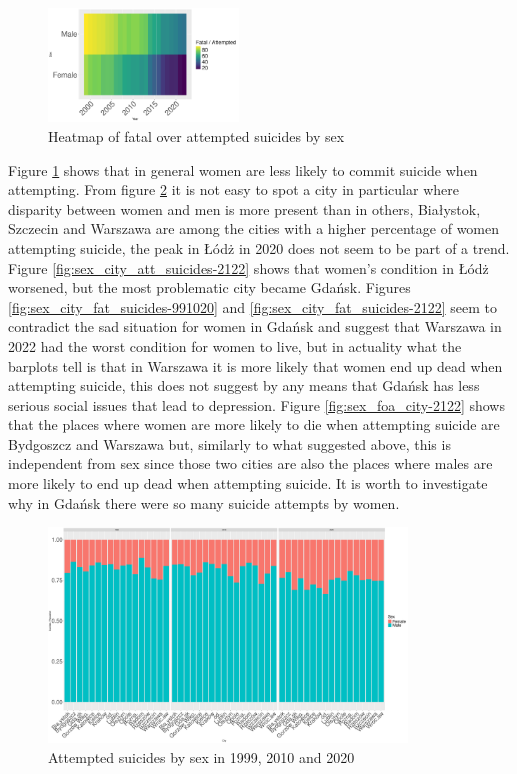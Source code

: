 \documentclass{article}
\begin{document}
\begin{figure}[H]
    \centering
    \includegraphics[width=0.45\textwidth]{imgs/sex_foa_heat.pdf}
    \caption{Heatmap of fatal over attempted suicides by sex}
    \label{fig:sex_foa_heat}
\end{figure}
%
%
Figure \ref{fig:sex_foa_heat} shows that in general women are less likely to commit
suicide when attempting.
%
From figure \ref{fig:sex_city_att_suicides-991020} it is not easy to spot a city in particular
where disparity between women and men is more present than in others,
Białystok, Szczecin and Warszawa are among the cities with a higher percentage
of women attempting suicide, the peak in Łódż in 2020 does not seem to be part of a trend.
Figure \ref{fig:sex_city_att_suicides-2122} shows that women's condition in Łódż worsened,
but the most problematic city became Gdańsk.
Figures \ref{fig:sex_city_fat_suicides-991020} and \ref{fig:sex_city_fat_suicides-2122}
seem to contradict the sad situation for women in Gdańsk and suggest that Warszawa
in 2022 had the worst condition for women to live, but in actuality what the barplots tell is
that in Warszawa it is more likely that women end up dead when attempting suicide,
this does not suggest by any means that Gdańsk has less serious social issues that lead
to depression.
Figure \ref{fig:sex_foa_city-2122} shows that the places where women are more likely to die 
when attempting 
suicide are Bydgoszcz and Warszawa but, similarly to what suggested above, 
this is independent from sex since those two cities are also the places where males are
more likely to end up dead when attempting suicide.
It is worth to investigate why in Gdańsk there were so many suicide attempts by women.
%
%
%
\begin{figure}[H]
    \centering
    \includegraphics[width=0.85\textwidth]{imgs/sex_city_att_suicides-991020.pdf}
    \caption{Attempted suicides by sex  in 1999, 2010 and 2020}
    \label{fig:sex_city_att_suicides-991020}
\end{figure}
\end{document}
